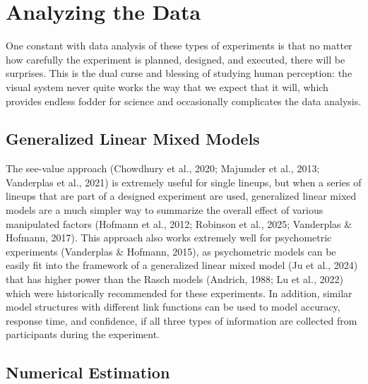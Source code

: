 \documentclass[
  10pt,
]{article}
\begin{document}
\section{Analyzing the Data}\label{sec-analysis}

One constant with data analysis of these types of experiments is that no
matter how carefully the experiment is planned, designed, and executed,
there will be surprises. This is the dual curse and blessing of studying
human perception: the visual system never quite works the way that we
expect that it will, which provides endless fodder for science and
occasionally complicates the data analysis.

\subsection{Generalized Linear Mixed
Models}\label{generalized-linear-mixed-models}

The see-value approach (Chowdhury et al., 2020; Majumder et al., 2013;
Vanderplas et al., 2021) is extremely useful for single lineups, but
when a series of lineups that are part of a designed experiment are
used, generalized linear mixed models are a much simpler way to
summarize the overall effect of various manipulated factors (Hofmann et
al., 2012; Robinson et al., 2025; Vanderplas \& Hofmann, 2017). This
approach also works extremely well for psychometric experiments
(Vanderplas \& Hofmann, 2015), as psychometric models can be easily fit
into the framework of a generalized linear mixed model (Ju et al., 2024)
that has higher power than the Rasch models (Andrich, 1988; Lu et al.,
2022) which were historically recommended for these experiments. In
addition, similar model structures with different link functions can be
used to model accuracy, response time, and confidence, if all three
types of information are collected from participants during the
experiment.

\subsection{Numerical Estimation}\label{numerical-estimation}
\end{document}
